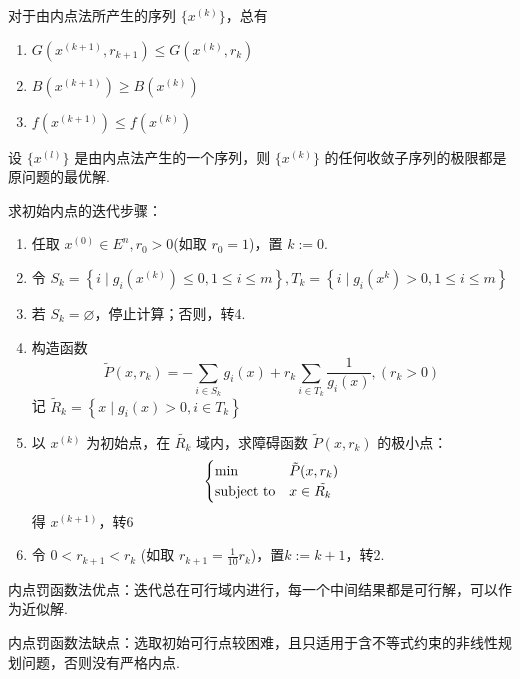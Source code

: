 \begin{theorem}
    对于由内点法所产生的序列 $\{x^{(k)}\}$，总有\begin{enumerate}
        \item $G(x^{(k + 1)}, r_{k + 1}) \le G(x^{(k)}, r_k)$
        \item $B(x^{(k + 1)}) \ge B(x^{(k)})$
        \item $f(x^{(k + 1)}) \le f(x^{(k)})$
    \end{enumerate}
\end{theorem}

\begin{theorem}
    设 $\{x^{(l)}\}$ 是由内点法产生的一个序列，则 $\{x^{(k)}\}$ 的任何收敛子序列的极限都是原问题的最优解.
\end{theorem}

\begin{remark}
    求初始内点的迭代步骤：\begin{enumerate}
        \item 任取 $x^{(0)} \in E^n, r_0 > 0$(如取 $r_0 = 1$)，置 $k := 0$.
        \item 令 $S_k = \left\{i \mid g_i(x^{(k)}) \le 0, 1 \le i \le m\right\}, T_k = \left\{i \mid g_i(x^{k}) > 0, 1 \le i \le m\right\}$
        \item 若 $S_k = \varnothing$，停止计算；否则，转4.
        \item 构造函数 \[\widetilde{P}\left(x, r_{k}\right)=-\sum_{i \in S_{k}} g_{i}(x)+r_{k} \sum_{i \in T_{k}} \frac{1}{g_{i}(x)},\left(r_{k}>0\right)\]
        记 $\widetilde{R}_{k}=\left\{x \mid g_{i}(x)>0 ,i \in T_{k}\right\}$
        \item 以 $x^{(k)}$ 为初始点，在 $\tilde{R_k}$ 域内，求障碍函数 $\tilde{P}(x, r_k)$ 的极小点：\[\begin{cases}
            \min &\tilde{P}(x, r_k)\\
            \operatorname{subject\ to} & x \in \tilde{R_k}
        \end{cases}\] 得 $x^{(k + 1)}$，转6
        \item 令 $ 0 < r_{k + 1} < r_k$ (如取 $r_{k + 1} = \frac{1}{10}r_k$)，置$k:=k+1$，转2.
    \end{enumerate}
\end{remark}

\begin{remark}
    内点罚函数法优点：迭代总在可行域内进行，每一个中间结果都是可行解，可以作为近似解.

    内点罚函数法缺点：选取初始可行点较困难，且只适用于含不等式约束的非线性规划问题，否则没有严格内点.
\end{remark}

